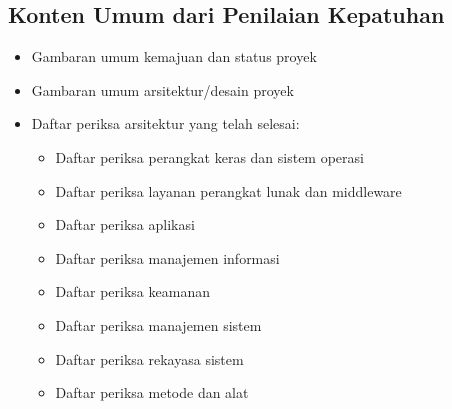 \subsection{Konten Umum dari Penilaian Kepatuhan}
\begin{itemize}
	\item Gambaran umum kemajuan dan status proyek
	\item Gambaran umum arsitektur/desain proyek
	\item Daftar periksa arsitektur yang telah selesai:
	\begin{itemize}
		\item Daftar periksa perangkat keras dan sistem operasi
		\item Daftar periksa layanan perangkat lunak dan middleware
		\item Daftar periksa aplikasi
		\item Daftar periksa manajemen informasi
		\item Daftar periksa keamanan
		\item Daftar periksa manajemen sistem
		\item Daftar periksa rekayasa sistem
		\item Daftar periksa metode dan alat
	\end{itemize}
\end{itemize}

